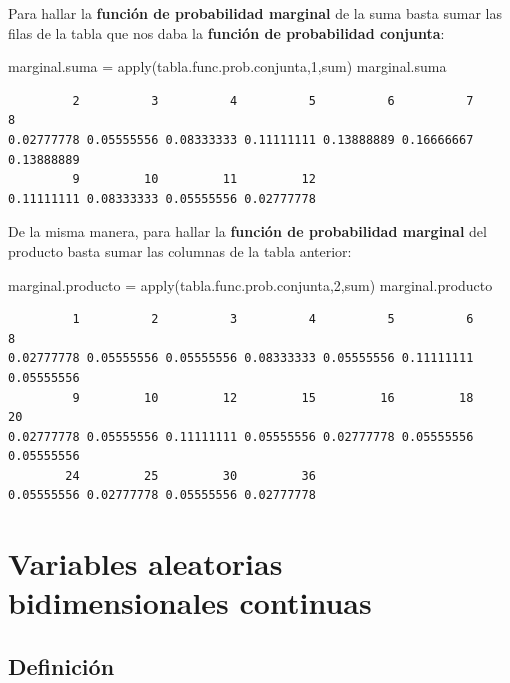 \documentclass[
  letterpaper,
  DIV=11,
  numbers=noendperiod]{scrreprt}
\newenvironment{Shaded}{\begin{snugshade}}{\end{snugshade}}
\newcommand{\DecValTok}[1]{\textcolor[rgb]{0.68,0.00,0.00}{#1}}
\newcommand{\FunctionTok}[1]{\textcolor[rgb]{0.28,0.35,0.67}{#1}}
\newcommand{\NormalTok}[1]{\textcolor[rgb]{0.00,0.23,0.31}{#1}}
\newcommand{\OtherTok}[1]{\textcolor[rgb]{0.00,0.23,0.31}{#1}}
\begin{document}
Para hallar la \textbf{función de probabilidad marginal} de la suma
basta sumar las filas de la tabla que nos daba la \textbf{función de
probabilidad conjunta}:

\begin{Shaded}
\begin{Highlighting}[]
\NormalTok{marginal.suma }\OtherTok{=} \FunctionTok{apply}\NormalTok{(tabla.func.prob.conjunta,}\DecValTok{1}\NormalTok{,sum)}
\NormalTok{marginal.suma}
\end{Highlighting}
\end{Shaded}

\begin{verbatim}
         2          3          4          5          6          7          8 
0.02777778 0.05555556 0.08333333 0.11111111 0.13888889 0.16666667 0.13888889 
         9         10         11         12 
0.11111111 0.08333333 0.05555556 0.02777778 
\end{verbatim}

De la misma manera, para hallar la \textbf{función de probabilidad
marginal} del producto basta sumar las columnas de la tabla anterior:

\begin{Shaded}
\begin{Highlighting}[]
\NormalTok{marginal.producto }\OtherTok{=} \FunctionTok{apply}\NormalTok{(tabla.func.prob.conjunta,}\DecValTok{2}\NormalTok{,sum)}
\NormalTok{marginal.producto}
\end{Highlighting}
\end{Shaded}

\begin{verbatim}
         1          2          3          4          5          6          8 
0.02777778 0.05555556 0.05555556 0.08333333 0.05555556 0.11111111 0.05555556 
         9         10         12         15         16         18         20 
0.02777778 0.05555556 0.11111111 0.05555556 0.02777778 0.05555556 0.05555556 
        24         25         30         36 
0.05555556 0.02777778 0.05555556 0.02777778 
\end{verbatim}

\hypertarget{variables-aleatorias-bidimensionales-continuas}{%
\section{Variables aleatorias bidimensionales
continuas}\label{variables-aleatorias-bidimensionales-continuas}}

\hypertarget{definiciuxf3n-2}{%
\subsection{Definición}\label{definiciuxf3n-2}}
\end{document}
